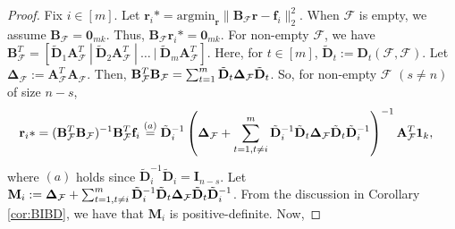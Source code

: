 \documentclass[journal,draftcls,onecolumn]{IEEEtran}
\theoremstyle{mystyle}
\newcommand{\bfr}{\mathbf{r}}
\newcommand{\bfD}{\mathbf{D}}
\newcommand{\bfA}{\mathbf{A}}
\newcommand{\bfB}{\mathbf{B}}
\newcommand{\bfM}{\mathbf{M}}
\newcommand{\cF}{\mathcal{F}}
\begin{document}
\begin{proof}
Fix $i \in [m]$. Let $\bfr_i* = \text{argmin}_{\mathbf{r}} \|\bfB_{\cF} \mathbf{r} - \mathbf{f}_i \|_2^2$. When $\cF$ is empty, we assume $\mathbf{B}_{\cF} = \mathbf{0}_{mk}$. Thus, $\mathbf{B}_{\cF}\mathbf{r}_i* = \mathbf{0}_{mk}$. For non-empty $\cF$, we have $\mathbf{B}_{\mathcal{F}}^T = [ \tilde{\bfD}_1 \bfA_{\mathcal{F}}^T ~|~ \tilde{\bfD}_2 \bfA_{\mathcal{F}}^T ~|~ \dots ~|~ \tilde{\bfD}_m\bfA_{\mathcal{F}}^T]$. Here, for $t \in [m]$, $\tilde{\mathbf{D}}_t := \mathbf{D}_t(\mathcal{F}, \mathcal{F})$. Let $\mathbf{\Delta}_{\mathcal{F}} := \mathbf{A}_{\mathcal{F}}^T \bfA_{\cF}$. Then, $\mathbf{B}_{\mathcal{F}}^T\mathbf{B}_{\mathcal{F}} = \sum_{t = 1}^m\tilde{\bf{D}}_t  \mathbf{\Delta}_{\cF} \tilde{\bf{D}}_t$. So, for non-empty $\mathcal{F}$ $(s \ne n)$ of size $n-s$,  
\begin{align*} 
\bfr_i* &=  (\bfB_{\cF}^T\bfB_{\cF})^{-1} \bfB_{\cF}^T  \mathbf{f}_i \overset{(a)}=  \tilde{\mathbf{D}}_i^{-1} \left(\mathbf{\Delta}_{\cF}  + \sum_{t = 1, t\ne i}^m\tilde{\bf{D}}_i^{-1}\tilde{\bf{D}}_t \mathbf{\Delta}_{\cF} \tilde{\bf{D}}_t\tilde{\bf{D}}_i^{-1}\right)^{-1}  \mathbf{A}_{\cF}^T \mathbf{1}_k,
\end{align*}
where
$(a)$ holds since $\tilde{\bfD}_i^{-1}\tilde{\bfD}_i = \mathbf{I}_{n-s}$. Let $\bfM_i := \mathbf{\Delta}_{\cF}  + \sum_{t = 1, t\ne i}^m\tilde{\bf{D}}_i^{-1}\tilde{\bf{D}}_t \mathbf{\Delta}_{\cF} \tilde{\bf{D}}_t\tilde{\bf{D}}_i^{-1}$. From the discussion in Corollary \ref{cor:BIBD}, we have that $\bfM_i$ is positive-definite. Now,

\end{proof}
\end{document}
